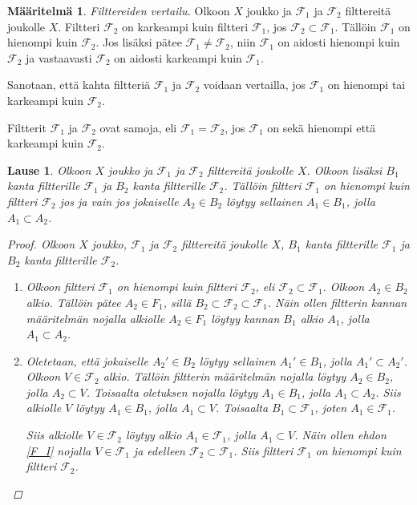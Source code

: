 \documentclass[12pt,a4paper,leqno]{report}
\newcommand{\F}{\mathcal{F}}
\theoremstyle{plain}
\newtheorem{lause}[equation]{Lause}
\theoremstyle{definition}
\newtheorem{maar}[equation]{Määritelmä}
\theoremstyle{remark}
\begin{document}
\begin{maar}
\emph{Filttereiden vertailu.}
Olkoon $X$ joukko ja $\F_1$ ja $\F_2$ filttereitä joukolle $X$. 
Filtteri $\F_2$ on karkeampi kuin filtteri $\F_1$, jos $\F_2\subset \F_1$. 
Tällöin $\F_1$ on hienompi kuin $\F_2$. 
Jos lisäksi pätee $\F_1\neq\F_2$, niin $\F_1$ on aidosti hienompi kuin $\F_2$ ja vastaavasti $\F_2$ on aidosti karkeampi kuin $\F_1$. 

Sanotaan, että kahta filtteriä $\F_1$ ja $\F_2$ voidaan vertailla, 
jos $\F_1$ on hienompi tai karkeampi kuin $\F_2$. 

Filtterit $\F_1$ ja $\F_2$ ovat samoja, eli $\F_1=\F_2$,
jos $\F_1$ on sekä hienompi että karkeampi kuin $\F_2$.
\end{maar}
\begin{lause}\label{filtterikantavertailu}
Olkoon $X$ joukko ja $\F_1$ ja $\F_2$ filttereitä joukolle $X$. 
Olkoon lisäksi $B_1$ kanta filtterille $\F_1$ ja $B_2$ kanta filtterille $\F_2$. 
Tällöin filtteri $\F_1$ on hienompi kuin filtteri $\F_2$ 
jos ja vain jos jokaiselle $A_2\in B_2$ löytyy 
sellainen $A_1\in B_1$, jolla $A_1\subset A_2$.
\begin{proof}
Olkoon $X$ joukko, $\F_1$ ja $\F_2$ filttereitä joukolle $X$, 
$B_1$ kanta filtterille $\F_1$ ja $B_2$ kanta filtterille $\F_2$. 
\begin{enumerate}
\item[$\Rightarrow$] 
Olkoon filtteri $\F_1$ on hienompi kuin filtteri $\F_2$, eli $\F_2\subset \F_1$. 
Olkoon $A_2\in B_2$ alkio. 
Tällöin pätee $A_2\in F_1$, 
sillä $B_2\subset\F_2\subset \F_1$. 
Näin ollen filtterin kannan määritelmän nojalla 
alkiolle $A_2\in F_1$ löytyy kannan $B_1$ 
alkio $A_1$, jolla $A_1\subset A_2$.
\item[$\Leftarrow$] 
Oletetaan, että 
jokaiselle $A_2'\in B_2$ löytyy 
sellainen $A_1'\in B_1$, jolla $A_1'\subset A_2'$. 
Olkoon $ V\in\F_2$ alkio. Tällöin 
filtterin määritelmän nojalla 
löytyy $A_2\in B_2$, jolla $A_2\subset V$. 
Toisaalta oletuksen nojalla 
löytyy $A_1\in B_1$, jolla $A_1\subset A_2$. 
Siis alkiolle $ V$ löytyy 
$A_1\in B_1$, jolla $A_1\subset V$. 
Toisaalta $B_1\subset \F_1$, 
joten $A_1\in \F_1$. 

Siis alkiolle $ V\in\F_2$ löytyy alkio
$A_1\in \F_1$, jolla $A_1\subset V$. 
Näin ollen ehdon \ref{F_I} nojalla $ V\in\F_1$ 
ja edelleen $\F_2\subset \F_1$. 
Siis filtteri $\F_1$ on hienompi kuin filtteri $\F_2$. 
\end{enumerate}
\end{proof}
\end{lause}
\end{document}
